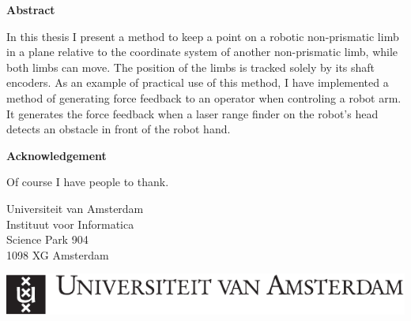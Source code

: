\thispagestyle{plain}

\vspace*{1.5cm}

{}
\begin{center}
\textbf{\color{blueish}Abstract}
\end{center}
\vspace*{-0.4cm}
In this thesis I present a method to keep a point on a robotic non-prismatic
limb in a plane relative to the coordinate system of another non-prismatic
limb, while both limbs can move.  The position of the limbs is tracked solely
by its shaft encoders.  As an example of
practical use of this method, I have implemented a method of generating
force feedback to an operator when controling a robot arm.  It generates the
force feedback when a laser range finder on the robot's head detects an
obstacle in front of the robot hand.

\vspace*{1.5cm}

{}
\begin{center}
\textbf{\color{blueish}Acknowledgement}
\end{center}
\vspace*{-0.4cm}
Of course I have people to thank.


\vfill
\noindent Universiteit van Amsterdam\\
Instituut voor Informatica\\
Science Park 904\\
1098 XG Amsterdam
\begin{center}
\includegraphics{uva_logo}
\end{center}

